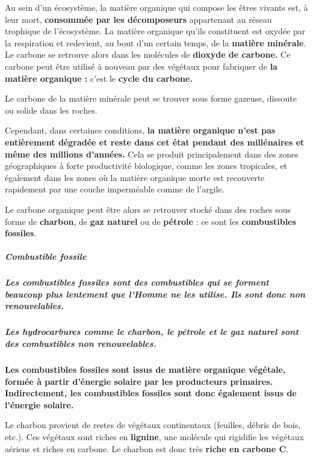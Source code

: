 \begin{itemize}
Au sein d'un écosystème, la matière organique qui compose les êtres
vivants est, à leur mort, \textbf{consommée par les décomposeurs}
appartenant au réseau trophique de l'écosystème. La matière organique
qu'ils constituent est oxydée par la respiration et redevient, au bout
d'un certain temps, de la \textbf{matière minérale}. Le carbone se
retrouve alors dans les molécules de \textbf{dioxyde de carbone.} Ce
carbone peut être utilisé à nouveau par des végétaux pour fabriquer de
\textbf{la matière organique :} c'est le \textbf{cycle du carbone.}

Le carbone de la matière minérale peut se trouver sous forme gazeuse,
dissoute ou solide dans les roches.

Cependant, dans certaines conditions, \textbf{la matière organique n'est
pas entièrement dégradée et reste dans cet état pendant des millénaires
et même des millions d'années.} Cela se produit principalement dans des
zones géographiques à forte productivité biologique, comme les zones
tropicales, et également dans les zones où la matière organique morte
est recouverte rapidement par une couche imperméable comme de l'argile.

Le carbone organique peut être alors se retrouver stocké dans des roches
sous forme de \textbf{charbon}, de \textbf{gaz naturel} ou de
\textbf{pétrole} : ce sont les \textbf{combustibles fossiles}.

\subparagraph{\texorpdfstring{\textbf{Combustible
fossile}}{Combustible fossile}}\label{combustible-fossile}

\subparagraph{Les combustibles fossiles sont des combustibles qui se
forment beaucoup plus lentement que l'Homme ne les utilise. Ils sont
donc non
renouvelables.}\label{les-combustibles-fossiles-sont-des-combustibles-qui-se-forment-beaucoup-plus-lentement-que-lhomme-ne-les-utilise.-ils-sont-donc-non-renouvelables.}

\subparagraph{Les hydrocarbures comme le charbon, le pétrole et le gaz
naturel sont des combustibles non
renouvelables.}\label{les-hydrocarbures-comme-le-charbon-le-puxe9trole-et-le-gaz-naturel-sont-des-combustibles-non-renouvelables.}

\textbf{Les combustibles fossiles sont issus de matière organique
végétale, formée à partir d'énergie solaire par les producteurs
primaires. Indirectement, les combustibles fossiles sont donc également
issus de l'énergie solaire.}

Le charbon provient de restes de végétaux continentaux (feuilles, débris
de bois, etc.). Ces végétaux sont riches en \textbf{lignine}, une
molécule qui rigidifie les végétaux aériens et riches en carbone. Le
charbon est donc très \textbf{riche en carbone C}.


\end{itemize}
